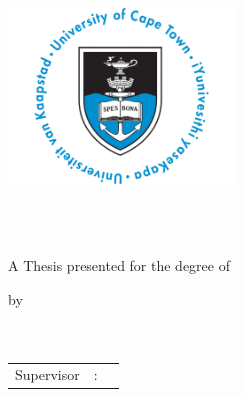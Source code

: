 \begin{titlepage}
	\begin{addmargin}[-1cm]{-3cm}
		\vspace{1cm}
		\begin{center}
			\includegraphics[width=6cm]{graphics/uct-logo}
			\large  
			
			\hfill
			
			\begingroup
			\huge{}\LARGE{}
			\huge{}\LARGE{}
			\huge{}\LARGE{} \\
			\endgroup
			\smallskip
			\normalsize
			\myDepartment
			
			\vfill
			\LARGE {\color{UCTblue}\spacedallcaps \myTitle} \\
			\vfill
			\Large A Thesis presented for the degree of  \myDegree \\
			\vfill
			
			\large by \\ %
			\smallskip
			\large \spacedallcaps{\myName} \\
			\smallskip
			\large \myTime \\ 
			
			\vfill
			
			\begin{tabular}{lll}

				Supervisor      & : & \mySupervisor
			\end{tabular}
			
			\vfill                      
			
		\end{center}  
	\end{addmargin}       
\end{titlepage}   